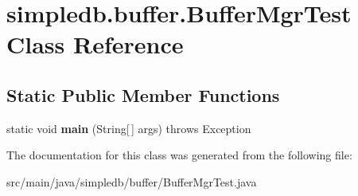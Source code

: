 \hypertarget{classsimpledb_1_1buffer_1_1BufferMgrTest}{}\section{simpledb.\+buffer.\+Buffer\+Mgr\+Test Class Reference}
\label{classsimpledb_1_1buffer_1_1BufferMgrTest}
\subsection*{Static Public Member Functions}
\begin{DoxyCompactItemize}
\item 
\mbox{\label{classsimpledb_1_1buffer_1_1BufferMgrTest_afdea94d4ad560736f66d9525debad878}} 
static void {\bfseries main} (String\mbox{[}$\,$\mbox{]} args)  throws Exception 
\end{DoxyCompactItemize}


The documentation for this class was generated from the following file\+:\begin{DoxyCompactItemize}
\item 
src/main/java/simpledb/buffer/Buffer\+Mgr\+Test.\+java\end{DoxyCompactItemize}
